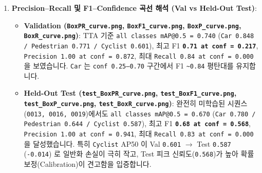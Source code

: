 \documentclass[10.5pt,a4paper]{article}
\begin{document}
\begin{enumerate}[leftmargin=1.8em,itemsep=2pt]
\item \textbf{Precision--Recall 및 F1--Confidence 곡선 해석 (Val vs Held-Out Test)}:
\begin{itemize}[leftmargin=1.5em,itemsep=2pt]
\item \textbf{Validation (\texttt{BoxPR\_\allowbreak{}curve.\allowbreak{}png}, \texttt{BoxF1\_\allowbreak{}curve.\allowbreak{}png}, \texttt{BoxP\_\allowbreak{}curve.\allowbreak{}png}, \texttt{BoxR\_\allowbreak{}curve.\allowbreak{}png})}: TTA 기준 \texttt{all classes mAP@0.\allowbreak{}5 = 0.\allowbreak{}740} (\texttt{Car 0.\allowbreak{}848 /\allowbreak{} Pedestrian 0.\allowbreak{}771 /\allowbreak{} Cyclist 0.\allowbreak{}601}), 최고 F1 \textbf{\texttt{0.\allowbreak{}71 at conf = 0.\allowbreak{}217}}, \texttt{Precision 1.\allowbreak{}00 at conf = 0.\allowbreak{}872}, 최대 \texttt{Recall 0.\allowbreak{}84 at conf = 0.\allowbreak{}000} 을 보였습니다. \texttt{Car} 는 \texttt{conf 0.\allowbreak{}25--0.\allowbreak{}70} 구간에서 F1 \texttt{\textasciitilde{}0.\allowbreak{}84} 평탄대를 유지합니다.
\item \textbf{Held-Out Test (\texttt{test\_\allowbreak{}BoxPR\_\allowbreak{}curve.\allowbreak{}png}, \texttt{test\_\allowbreak{}BoxF1\_\allowbreak{}curve.\allowbreak{}png}, \texttt{test\_\allowbreak{}BoxP\_\allowbreak{}curve.\allowbreak{}png}, \texttt{test\_\allowbreak{}BoxR\_\allowbreak{}curve.\allowbreak{}png})}: 완전히 미학습된 시퀀스(\texttt{0013,\allowbreak{} 0016,\allowbreak{} 0019})에서도 \texttt{all classes mAP@0.\allowbreak{}5 = 0.\allowbreak{}670} (\texttt{Car 0.\allowbreak{}780 /\allowbreak{} Pedestrian 0.\allowbreak{}644 /\allowbreak{} Cyclist 0.\allowbreak{}587}), 최고 F1 \textbf{\texttt{0.\allowbreak{}68 at conf = 0.\allowbreak{}568}}, \texttt{Precision 1.\allowbreak{}00 at conf = 0.\allowbreak{}941}, 최대 \texttt{Recall 0.\allowbreak{}83 at conf = 0.\allowbreak{}000} 을 달성했습니다. 특히 \texttt{Cyclist} AP50 이 Val \texttt{0.\allowbreak{}601} $\rightarrow$ Test \texttt{0.\allowbreak{}587} (\texttt{-\allowbreak{}0.\allowbreak{}014}) 로 일반화 손실이 극히 작고, Test 피크 신뢰도(\texttt{0.\allowbreak{}568})가 높아 확률 보정(Calibration)이 견고함을 입증합니다.
\end{itemize}
\end{enumerate}
\end{document}
